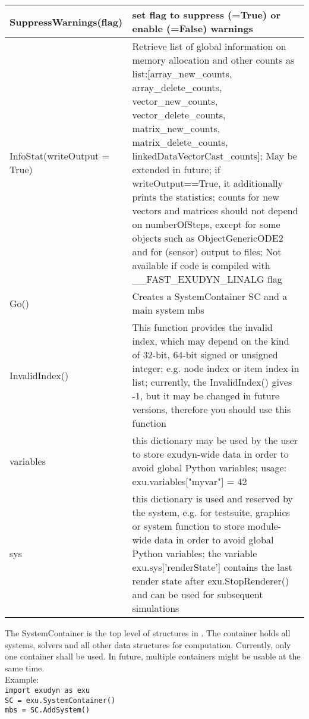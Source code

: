 \begin{center}
\begin{longtable}{| p{8cm} | p{8cm} |}
  SuppressWarnings(flag) & set flag to suppress (=True) or enable (=False) warnings\\ \hline 
  InfoStat(writeOutput = True) & Retrieve list of global information on memory allocation and other counts as list:[array\_new\_counts, array\_delete\_counts, vector\_new\_counts, vector\_delete\_counts, matrix\_new\_counts, matrix\_delete\_counts, linkedDataVectorCast\_counts]; May be extended in future; if writeOutput==True, it additionally prints the statistics; counts for new vectors and matrices should not depend on numberOfSteps, except for some objects such as ObjectGenericODE2 and for (sensor) output to files; Not available if code is compiled with \_\_FAST\_EXUDYN\_LINALG flag\\ \hline 
  Go() & Creates a SystemContainer SC and a main system mbs\\ \hline 
  InvalidIndex() & This function provides the invalid index, which may depend on the kind of 32-bit, 64-bit signed or unsigned integer; e.g. node index or item index in list; currently, the InvalidIndex() gives -1, but it may be changed in future versions, therefore you should use this function\\ \hline 
  variables & this dictionary may be used by the user to store exudyn-wide data in order to avoid global Python variables; usage: exu.variables["myvar"] = 42 \\ \hline  
  sys & this dictionary is used and reserved by the system, e.g. for testsuite, graphics or system function to store module-wide data in order to avoid global Python variables; the variable exu.sys['renderState'] contains the last render state after exu.StopRenderer() and can be used for subsequent simulations \\ \hline  
\end{longtable}
\end{center}

The SystemContainer is the top level of structures in \codeName. The container holds all systems, solvers and all other data structures for computation. Currently, only one container shall be used. In future, multiple containers might be usable at the same time. \\ Example: \\ \texttt{import exudyn as exu \\ SC = exu.SystemContainer() \\ mbs = SC.AddSystem()}

